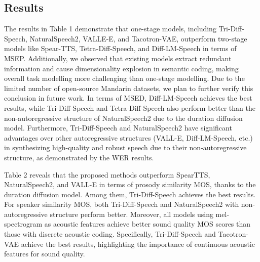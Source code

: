 \documentclass{article}
\begin{document}
\subsection{Results}
The results in Table 1 demonstrate that one-stage models, including Tri-Diff-Speech, NaturalSpeech2, VALLE-E, and Tacotron-VAE, outperform two-stage models like Spear-TTS, Tetra-Diff-Speech, and Diff-LM-Speech in terms of MSEP. Additionally, we observed that existing models extract redundant information and cause dimensionality explosion in semantic coding, making overall task modelling more challenging than one-stage modelling. Due to the limited number of open-source Mandarin datasets, we plan to further verify this conclusion in future work. In terms of MSED, Diff-LM-Speech achieves the best results, while Tri-Diff-Speech and Tetra-Diff-Speech also perform better than the non-autoregressive structure of NaturalSpeech2 due to the duration diffusion model. Furthermore, Tri-Diff-Speech and NaturalSpeech2 have significant advantages over other autoregressive structures (VALL-E, Diff-LM-Speech, etc.) in synthesizing high-quality and robust speech due to their non-autoregressive structure, as demonstrated by the WER results.


Table 2 reveals that the proposed methods outperform SpearTTS, NaturalSpeech2, and VALL-E in terms of prosody similarity MOS, thanks to the duration diffusion model. Among them, Tri-Diff-Speech achieves the best results. For speaker similarity MOS, both Tri-Diff-Speech and NaturalSpeech2 with non-autoregressive structure perform better. Moreover, all models using mel-spectrogram as acoustic features achieve better sound quality MOS scores than those with discrete acoustic coding. Specifically, Tri-Diff-Speech and Tacotron-VAE achieve the best results, highlighting the importance of continuous acoustic features for sound quality.
\end{document}
